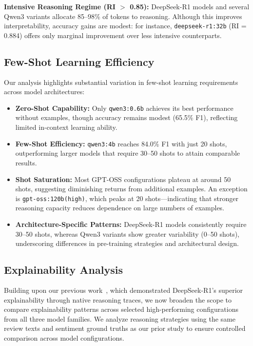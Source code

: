 \documentclass[conference]{IEEEtran}
\newcommand{\deepseekr}[1]{\texttt{deepseek-r1:#1}}
\newcommand{\qwenthree}[1]{\texttt{qwen3:#1}}
\newcommand{\DeepSeekR}{DeepSeek-R1}
\newcommand{\QwendThree}{Qwen3}
\begin{document}
\textbf{Intensive Reasoning Regime (RI $>$ 0.85):}
\DeepSeekR{} models and several \QwendThree{} variants allocate 85--98\% of tokens to reasoning. 
Although this improves interpretability, accuracy gains are modest: for instance, 
\deepseekr{32b} (RI = 0.884) offers only marginal improvement over less intensive counterparts.

\subsection{Few-Shot Learning Efficiency}

Our analysis highlights substantial variation in few-shot learning requirements across model architectures:

\begin{itemize}
    \item \textbf{Zero-Shot Capability:} Only \qwenthree{0.6b} achieves its best performance without examples, though accuracy remains modest (65.5\% F1), reflecting limited in-context learning ability.
    
    \item \textbf{Few-Shot Efficiency:} \qwenthree{4b} reaches 84.0\% F1 with just 20 shots, outperforming larger models that require 30--50 shots to attain comparable results.

    \item \textbf{Shot Saturation:} Most GPT-OSS configurations plateau at around 50 shots, suggesting diminishing returns from additional examples. An exception is \texttt{gpt-oss:120b(high)}, which peaks at 20 shots---indicating that stronger reasoning capacity reduces dependence on large numbers of examples.
    
    \item \textbf{Architecture-Specific Patterns:} \DeepSeekR{} models consistently require 30--50 shots, whereas \QwendThree{} variants show greater variability (0--50 shots), underscoring differences in pre-training strategies and architectural design.
\end{itemize}

\subsection{Explainability Analysis}
Building upon our previous work~\cite{huang2025explainable}, which demonstrated \DeepSeekR's
superior explainability through native reasoning traces, we now broaden the scope to compare
explainability patterns across selected high-performing configurations from all three model families. 
We analyze reasoning strategies using the same review texts and sentiment ground truths as our prior 
study to ensure controlled comparison across model configurations.
\end{document}
